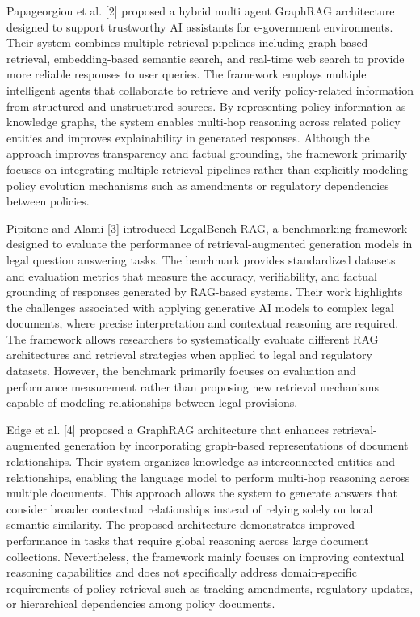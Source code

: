 \documentclass[conference]{IEEEtran}
\begin{document}
Papageorgiou et al. [2] proposed a hybrid multi agent GraphRAG architecture designed to support trustworthy AI assistants for e-government environments. Their system combines multiple retrieval pipelines including graph-based retrieval, embedding-based semantic search, and real-time web search to provide more reliable responses to user queries. The framework employs multiple intelligent agents that collaborate to retrieve and verify policy-related information from structured and unstructured sources. By representing policy information as knowledge graphs, the system enables multi-hop reasoning across related policy entities and improves explainability in generated responses. Although the approach improves transparency and factual grounding, the framework primarily focuses on integrating multiple retrieval pipelines rather than explicitly modeling policy evolution mechanisms such as amendments or regulatory dependencies between policies.

Pipitone and Alami [3] introduced LegalBench RAG, a benchmarking framework designed to evaluate the performance of retrieval-augmented generation models in legal question answering tasks. The benchmark provides standardized datasets and evaluation metrics that measure the accuracy, verifiability, and factual grounding of responses generated by RAG-based systems. Their work highlights the challenges associated with applying generative AI models to complex legal documents, where precise interpretation and contextual reasoning are required. The framework allows researchers to systematically evaluate different RAG architectures and retrieval strategies when applied to legal and regulatory datasets. However, the benchmark primarily focuses on evaluation and performance measurement rather than proposing new retrieval mechanisms capable of modeling relationships between legal provisions.

Edge et al. [4] proposed a GraphRAG architecture that enhances retrieval-augmented generation by incorporating graph-based representations of document relationships. Their system organizes knowledge as interconnected entities and relationships, enabling the language model to perform multi-hop reasoning across multiple documents. This approach allows the system to generate answers that consider broader contextual relationships instead of relying solely on local semantic similarity. The proposed architecture demonstrates improved performance in tasks that require global reasoning across large document collections. Nevertheless, the framework mainly focuses on improving contextual reasoning capabilities and does not specifically address domain-specific requirements of policy retrieval such as tracking amendments, regulatory updates, or hierarchical dependencies among policy documents.
\end{document}

